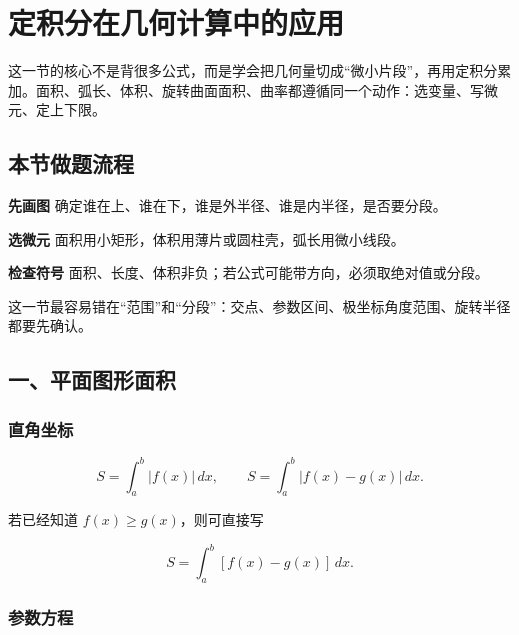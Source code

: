 \section{定积分在几何计算中的应用}

这一节的核心不是背很多公式，而是学会把几何量切成“微小片段”，再用定积分累加。面积、弧长、体积、旋转曲面面积、曲率都遵循同一个动作：选变量、写微元、定上下限。

\subsection*{本节做题流程}

\begin{conceptbox}
\textbf{先画图}
确定谁在上、谁在下，谁是外半径、谁是内半径，是否要分段。
\end{conceptbox}

\begin{conceptbox}
\textbf{选微元}
面积用小矩形，体积用薄片或圆柱壳，弧长用微小线段。
\end{conceptbox}

\begin{conceptbox}
\textbf{检查符号}
面积、长度、体积非负；若公式可能带方向，必须取绝对值或分段。
\end{conceptbox}

\begin{notebox}
这一节最容易错在“范围”和“分段”：交点、参数区间、极坐标角度范围、旋转半径都要先确认。
\end{notebox}

\subsection*{一、平面图形面积}

\subsubsection*{直角坐标}

\[
      S=\int_a^b |f(x)|\,dx,\qquad
      S=\int_a^b |f(x)-g(x)|\,dx.
    \]

若已经知道 \(f(x)\ge g(x)\)，则可直接写

\[
      S=\int_a^b [f(x)-g(x)]\,dx.
    \]

\subsubsection*{参数方程}

